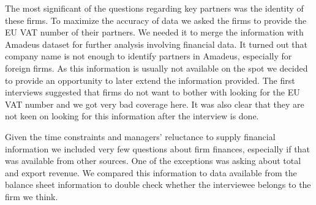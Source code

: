 \usepackage{}\documentclass[final, dvipsnames, authoryear,12pt]{elsarticle}
\begin{document}
The most significant of the questions regarding key partners was the identity of these firms. To maximize the accuracy of data we asked the firms to provide the EU VAT number of their partners. We needed it to merge the information with Amadeus dataset for further analysis involving financial data. It turned out that company name is not enough to identify partners in Amadeus, especially for foreign firms. As this information is usually not available on the spot we decided to provide an opportunity to later extend the information provided. The first interviews suggested that firms do not want to bother with looking for the EU VAT number and we got very bad coverage here. It was also clear that they are not keen on looking for this information after the interview is done.





Given the time constraints and managers' reluctance to supply financial information \citep{Bloom2014-hc} we included very few questions about firm finances, especially if that was available from other sources. One of the exceptions was asking about total and export revenue. We compared this information to data available from the balance sheet information to double check whether the interviewee belongs to the firm we think. 

\end{document}
